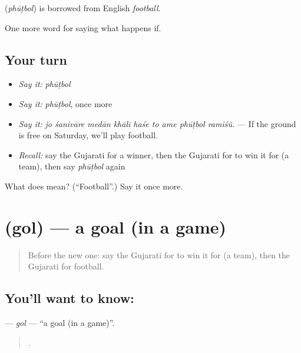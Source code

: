\begin{cousinweb}
\textbf{} (\emph{phūṭbol}) is borrowed from English \emph{football}.
\end{cousinweb}

\begin{grammarlens}[title={What you've built}]
One more word for saying what happens if.
\end{grammarlens}

\subsection*{Your turn}
\begin{itemize}
\raggedright
  \item \emph{Say it:} \emph{phūṭbol}
  \item \emph{Say it:} \emph{phūṭbol}, once more
  \item \emph{Say it:} \emph{jo śanivāre medān khālī haśe to ame phūṭbol ramīśũ.} — If the ground is free on Saturday, we'll play football.
  \item \emph{Recall:} say the Gujarati for a winner, then the Gujarati for to win it for (a team), then say \emph{phūṭbol} again
\end{itemize}

\begin{tcolorbox}[breakable,colback=teal!4,colframe=teal!35!black,title={Before you move on}]
What does  mean? (\textquotedblleft{}Football\textquotedblright{}.) Say it once more.
\end{tcolorbox}
\section[\texorpdfstring{\gu{ગોલ} (gol)}{ગોલ (gol)}]{ (gol) — a goal (in a game)}

\label{lesson:GU-C549-gol}



\begin{quote}
Before the new one: say the Gujarati for to win it for (a team), then the Gujarati for football.
\end{quote}

\subsection*{You'll want to know: }
\textbf{} — \emph{gol} — \textquotedblleft{}a goal (in a game)\textquotedblright{}.

\begin{quote}
        .
\end{quote}

